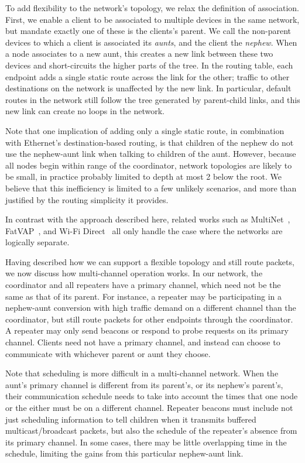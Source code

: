 To add flexibility to the network's topology, we relax the definition of association.
First, we enable a client to be associated to multiple devices in the same network, but mandate exactly one of these is the clients's parent. We call the non-parent devices to which a client is associated its \emph{aunts}, and the client the \emph{nephew}. When a node associates to a new aunt, this creates a new link between these two devices and short-circuits the higher parts of the tree. In the routing table, each endpoint adds a single static route across the link for the other; traffic to other destinations on the network is unaffected by the new link. In particular, default routes in the network still follow the tree generated by parent-child links, and this new link can create no loops in the network.

Note that one implication of adding only a single static route, in combination with Ethernet's destination-based routing, is that children of the nephew do not use the nephew-aunt link when talking to children of the aunt. However, because all nodes begin within range of the coordinator, network topologies are likely to be small, in practice probably limited to depth at most 2 below the root. We believe that this inefficiency is limited to a few unlikely scenarios, and more than justified by the routing simplicity it provides.

In contrast with the approach described here, related works such as MultiNet~\cite{chandra_multinet}, FatVAP~\cite{kandula_fatvap}, and Wi-Fi Direct~\cite{wifi_direct} all only handle the case where the networks are logically separate.

Having described how we can support a flexible topology and still route packets, we now discuss how multi-channel operation works. In our network, the coordinator and all repeaters have a primary channel, which need not be the same as that of its parent. For instance, a repeater may be participating in a nephew-aunt conversion with high traffic demand on a different channel than the coordinator, but still route packets for other endpoints through the coordinator. A repeater may only send beacons or respond to probe requests on its primary channel. Clients need not have a primary channel, and instead can choose to communicate with whichever parent or aunt they choose.

Note that scheduling is more difficult in a multi-channel network. When the aunt's primary channel is different from its parent's, or its nephew's parent's, their communication schedule needs to take into account the times that one node or the either must be on a different channel. Repeater beacons must include not just scheduling information to tell children when it transmits buffered multicast/broadcast packets, but also the schedule of the repeater's absence from its primary channel. In some cases, there may be little overlapping time in the schedule, limiting the gains from this particular nephew-aunt link. 


